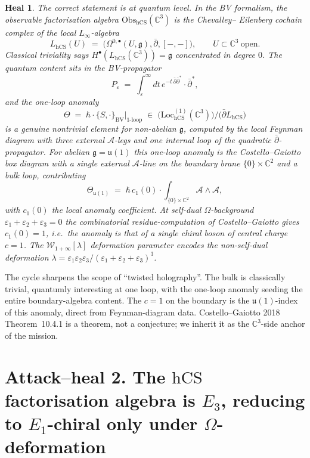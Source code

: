 \documentclass[11pt]{article}
\newtheorem*{heal}{Heal}
\providecommand{\Eone}{E_1}
\providecommand{\Ethree}{E_3}
\providecommand{\C}{\mathbb{C}}
\providecommand{\cA}{\mathcal{A}}
\providecommand{\cW}{\mathcal{W}}
\providecommand{\fg}{\mathfrak{g}}
\providecommand{\fu}{\mathfrak{u}}
\providecommand{\hCS}{\mathrm{hCS}}
\providecommand{\BV}{\mathrm{BV}}
\providecommand{\Obs}{\mathrm{Obs}}
\providecommand{\dbar}{\bar\partial}
\begin{document}
\begin{heal}
The correct statement is at quantum level. In the BV formalism, the
observable factorisation algebra $\Obs_{\hCS}(\C^3)$ is the Chevalley--
Eilenberg cochain complex of the local $L_\infty$-algebra
\[
  L_{\hCS}(U) \;=\; \bigl(\Omega^{0,\bullet}(U, \fg), \dbar, [-,-]\bigr),
  \qquad U \subset \C^3\ \text{open.}
\]
Classical triviality says $H^\bullet(L_{\hCS}(\C^3)) = \fg$ concentrated
in degree $0$. The quantum content sits in the BV-propagator
\[
  P_\varepsilon \;=\; \int_\varepsilon^\infty\!dt\,
  e^{-t\,\dbar\dbar^*} \cdot \dbar^*,
\]
and the one-loop anomaly
\[
  \Theta \;=\; \hbar\cdot\{S, \cdot\}_{\BV}|_{\text{1-loop}}
  \;\in\; \bigl(\mathrm{Loc}^{(1)}_{\hCS}(\C^3)\bigr)\big/\bigl(\dbar L_{\hCS}\bigr)
\]
is a genuine nontrivial element for non-abelian $\fg$, computed by the
local Feynman diagram with three external $\cA$-legs and one internal
loop of the quadratic $\dbar$-propagator. For abelian $\fg = \fu(1)$
this one-loop anomaly is the Costello--Gaiotto box diagram with a single
external $\cA$-line on the boundary brane $\{0\}\times\C^2$ and a bulk
loop, contributing
\[
  \Theta_{\fu(1)} \;=\; \hbar\, c_1(0) \cdot
  \int_{\{0\}\times\C^2} \cA \wedge \cA,
\]
with $c_1(0)$ the local anomaly coefficient. At self-dual $\Omega$-background
$\varepsilon_1 + \varepsilon_2 + \varepsilon_3 = 0$ the combinatorial
residue-computation of Costello--Gaiotto gives $c_1(0) = 1$, i.e.\ the
anomaly is that of a single chiral boson of central charge $c = 1$.
The $\cW_{1+\infty}[\lambda]$ deformation parameter encodes the
non-self-dual deformation
$\lambda = \varepsilon_1\varepsilon_2\varepsilon_3/(\varepsilon_1+\varepsilon_2+\varepsilon_3)^3$.
\end{heal}

The cycle sharpens the scope of ``twisted holography''. The bulk is
classically trivial, quantumly interesting at one loop, with the
one-loop anomaly seeding the entire boundary-algebra content.
The $c = 1$ on the boundary is the $\fu(1)$-index of this anomaly,
direct from Feynman-diagram data. Costello--Gaiotto 2018 Theorem~10.4.1
is a theorem, not a conjecture; we inherit it as the $\C^3$-side anchor
of the mission.

\section{Attack--heal 2. The $\hCS$ factorisation algebra is $\Ethree$,
  reducing to $\Eone$-chiral only under $\Omega$-deformation}
\label{sec:cycle2}
\end{document}
